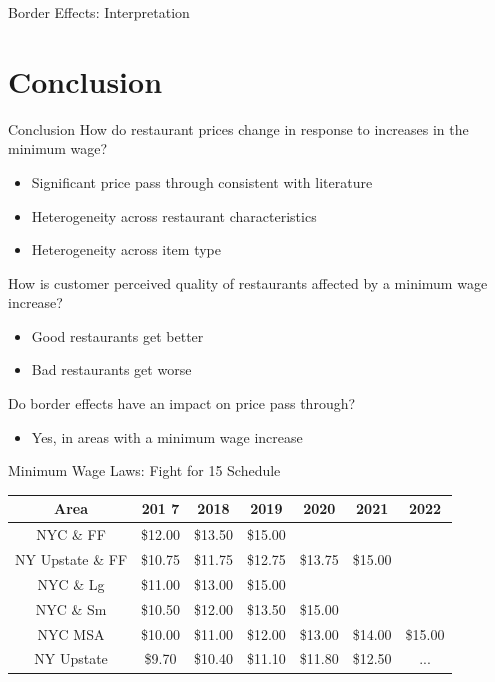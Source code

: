 \documentclass[xcolor=table]{beamer}
\begin{document}
\begin{spacing}{1.2}
\begin{frame}{Border Effects: Interpretation}
\end{frame}

\section{Conclusion}

\begin{frame}{Conclusion}
 How do restaurant prices change in response to increases in the minimum wage?
\begin{itemize}
\item Significant price pass through consistent with literature
\item Heterogeneity across restaurant characteristics
\item Heterogeneity across item type
\end{itemize}
 How is customer perceived quality of restaurants affected by a minimum wage increase?
\begin{itemize}
\item Good restaurants get better
\item Bad restaurants get worse
\end{itemize}
 Do border effects have an impact on price pass through?
\begin{itemize}
\item Yes, in areas with a minimum wage increase
\end{itemize}
\end{frame}


\begin{frame}[label=supplemental]{Minimum Wage Laws: Fight for 15 Schedule}
\footnotesize
\centering
\begin{tabular}{ c c c c c c c} \\ \hline \hline
 Area & 201 7& 2018 & 2019 & 2020 & 2021 & 2022 \\ \hline \hline
 NYC \& FF & \$12.00 & \$13.50 & \$15.00 \\
 NY Upstate \& FF  & \$10.75 & \$11.75 & \$12.75 & \$13.75 & \$15.00 \\
NYC \& Lg & \$11.00 & \$13.00 & \$15.00 \\
NYC \& Sm & \$10.50 & \$12.00 & \$13.50 & \$15.00 \\
NYC MSA & \$10.00 & \$11.00 & \$12.00 & \$13.00 & \$14.00 &  \$15.00 \\
NY Upstate &\$9.70 & \$10.40 & \$11.10 &  \$11.80 & \$12.50 & ... \\
\end{tabular}

\bigskip

\raggedleft
\hyperlink{main}{}
\end{frame}


\end{spacing}
\end{document}
